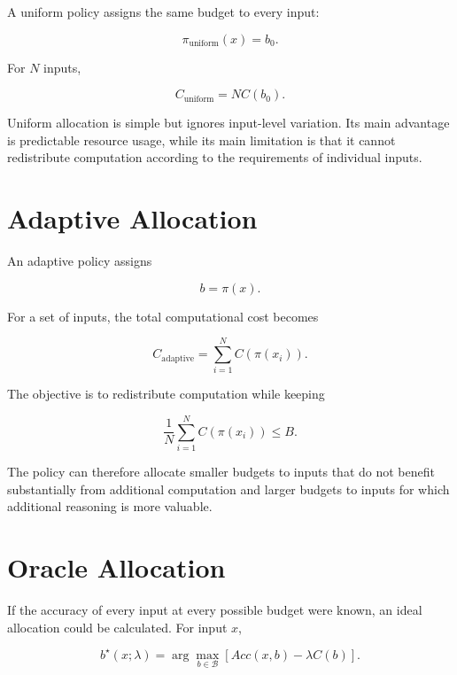 \documentclass[12pt,a4paper,titlepage]{report}
\begin{document}
A uniform policy assigns the same budget to every input:

\begin{equation}
\pi_{\mathrm{uniform}}(x)=b_0.
\end{equation}

For $N$ inputs,

\begin{equation}
C_{\mathrm{uniform}}
=
NC(b_0).
\end{equation}

Uniform allocation is simple but ignores input-level variation. Its main advantage is predictable resource usage, while its main limitation is that it cannot redistribute computation according to the requirements of individual inputs.

\section{Adaptive Allocation}

An adaptive policy assigns

\begin{equation}
b=\pi(x).
\end{equation}

For a set of inputs, the total computational cost becomes

\begin{equation}
C_{\mathrm{adaptive}}
=
\sum_{i=1}^{N}
C(\pi(x_i)).
\end{equation}

The objective is to redistribute computation while keeping

\begin{equation}
\frac{1}{N}
\sum_{i=1}^{N}
C(\pi(x_i))
\leq B.
\end{equation}

The policy can therefore allocate smaller budgets to inputs that do not benefit substantially from additional computation and larger budgets to inputs for which additional reasoning is more valuable.

\section{Oracle Allocation}

If the accuracy of every input at every possible budget were known, an ideal allocation could be calculated. For input $x$,

\begin{equation}
b^\star(x;\lambda)
=
\arg\max_{b\in\mathcal{B}}
[
Acc(x,b)-\lambda C(b)
].
\end{equation}
\end{document}
